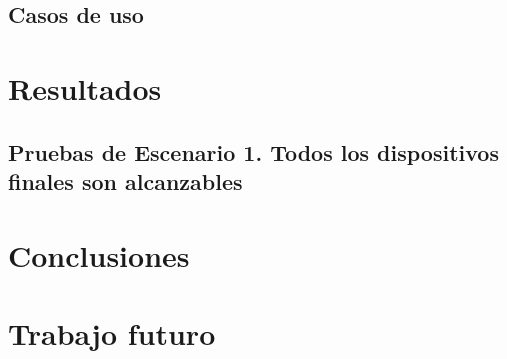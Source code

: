 \documentclass[letterpaper,12pt,oneside]{book}
\begin{document}
\section{Casos de uso}



\chapter{Resultados}  %



\section{Pruebas de Escenario 1. Todos los dispositivos finales son alcanzables}


\chapter{Conclusiones}  %


\chapter{Trabajo futuro}  %



\end{document}
